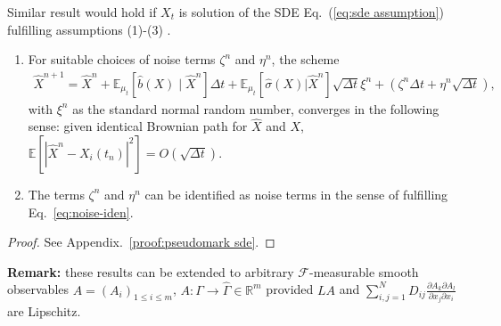 \documentclass[11pt, a4paper, oneside, reqno]{amsart}
\begin{document}
\begin{corollary} \label{corol:pseudo-mark-sde} Similar result would hold if $X_t$ is solution of the SDE Eq.~(\ref{eq:sde assumption}) fulfilling assumptions (1)-(3) .
\begin{enumerate}
\item For suitable choices of noise terms $\zeta^n$ and $\eta^n$, the scheme 
 \begin{eqnarray}
            \hat{X}^{n+1} = \hat{X}^{n} +  \mathbb{E}_{\mu_t}[\hat{b}(X)\mid\hat{X}^n]\Delta t+\mathbb{E}_{\mu_t}[\hat{\sigma}(X)|\hat{X}^n] \sqrt{\Delta t}\xi^n+\left(\zeta^n\Delta t+\eta^n \sqrt{\Delta t}\right), 
        \end{eqnarray}
        with $\xi^n$ as the standard normal random number, converges in the following sense: given identical Brownian path for $\hat{X}$ and $X$, $\mathbb{E}[|\hat{X}^n-X_i(t_n)|^2]=O(\sqrt{\Delta t})$. 
\item The terms $\zeta^n$ and $\eta^n$ can be identified as noise terms in the sense of fulfilling Eq.~\eqref{eq:noise-iden}.
\end{enumerate}        
\end{corollary}
\begin{proof}
    See Appendix.~\ref{proof:pseudomark sde}.
\end{proof}
\noindent \textbf{Remark:} these results can be extended to arbitrary $\mathcal{F}$-measurable smooth observables $A=(A_i)_{1\leq i\leq m}$, $A:\Gamma\to\hat{\Gamma}\in\mathbb{R}^m$ provided $LA$ and $\sum_{i,j=1}^ND_{ij}\frac{\partial A_k \partial A_l}{\partial x_j \partial x_i}$ are Lipschitz.
\end{document}
